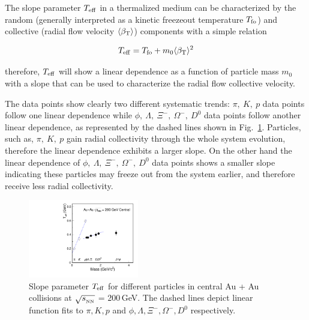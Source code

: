 \documentclass[%
 reprint,	
 amsmath,amssymb,
 aps,
 prc,
]{revtex4-1}
\begin{document}
The slope parameter $T_{\rm eff}$ in a thermalized medium can be characterized by the random (generally interpreted as a kinetic freezeout temperature $T_{\rm fo}$) and collective (radial flow velocity $\langle\beta_{\rm T}\rangle$) components with a simple relation~\cite{StarWhitePaper,Csorgo:1995bi,Kolb:2003dz}

\[
T_{\rm eff} = T_{\rm fo} + m_0 \langle\beta_{\rm T}\rangle^2
\]

therefore, $T_{\rm eff}$ will show a linear dependence as a function of particle mass $m_0$ with a slope that can be used to characterize the radial flow collective velocity.

The data points show clearly two different systematic trends: $\pi,\ K,\ p$ data points follow one linear dependence while $\phi,\ \Lambda,\ \Xi^{-},\ \Omega^{-},\ D^0$ data points follow another linear dependence, as represented by the dashed lines shown in Fig.~\ref{fig:Teff_ALL}. Particles, such as, $\pi,\ K,\ p$ gain radial collectivity through the whole system evolution, therefore the linear dependence exhibits a larger slope. On the other hand the linear dependence of $\phi,\ \Lambda,\ \Xi^{-},\ \Omega^{-},\ D^0$ data points shows a smaller slope indicating these particles may freeze out from the system earlier, and therefore receive less radial collectivity.


\begin{figure}
\centering
\includegraphics[width=0.43\textwidth]{fig/Teff_ALL.pdf}
\caption{Slope parameter $T_{\rm eff}$ for different particles in central Au + Au collisions at $\sqrt{s_{_{\rm NN}}}$ = 200\,GeV. The dashed lines depict linear function fits to $\pi,K,p$ and $\phi,\Lambda,\Xi^{-},\Omega^{-},D^0$ respectively.}
\label{fig:Teff_ALL} 
\end{figure}
\end{document}
